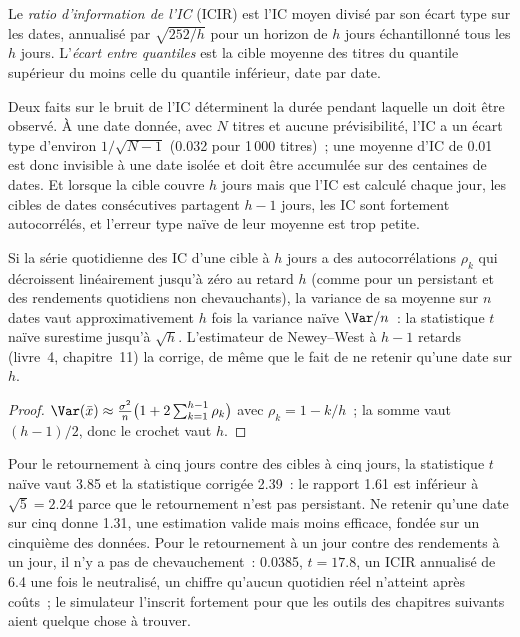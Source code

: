 \begin{definition}\label{def:rs:anatomy-of-a-predictor:icir}
Le \emph{ratio d'information de l'IC} (ICIR) est l'IC moyen divisé par son écart type sur les
dates, annualisé par $\sqrt{252/h}$ pour un horizon de $h$ jours échantillonné tous les $h$ jours. L'\emph{écart entre quantiles} est
la cible moyenne des titres du quantile supérieur du  moins celle du quantile inférieur, date par date.
\end{definition}

Deux faits sur le bruit de l'IC déterminent la durée pendant laquelle un  doit être observé. À une date donnée, avec $N$ titres
et aucune prévisibilité, l'IC a un écart type d'environ $1/\sqrt{N - 1}$ (0.032 pour 1\,000 titres)~; une moyenne d'IC de 0.01 est donc
invisible à une date isolée et doit être accumulée sur des centaines de dates. Et lorsque la cible couvre $h$ jours mais que l'IC est calculé chaque jour, les
cibles de dates consécutives partagent $h - 1$ jours, les IC sont fortement autocorrélés, et
l'erreur type naïve de leur moyenne est trop petite.

\begin{proposition}\label{prop:rs:anatomy-of-a-predictor:overlap}
Si la série quotidienne des IC d'une cible à $h$ jours a des autocorrélations $\rho_k$ qui décroissent linéairement jusqu'à zéro au retard $h$ (comme pour un
 persistant et des rendements quotidiens non chevauchants), la variance de sa moyenne sur $n$ dates vaut approximativement $h$ fois la
variance naïve $\Var/n$~: la statistique $t$ naïve surestime jusqu'à $\sqrt h$. L'estimateur de Newey--West à $h - 1$ retards (livre~4,
chapitre~11) la corrige, de même que le fait de ne retenir qu'une date sur $h$.
\end{proposition}

\begin{proof}
$\Var(\bar x) \approx \frac{\sigma^2}{n}\bigl(1 + 2\sum_{k=1}^{h-1}\rho_k\bigr)$ avec $\rho_k = 1 - k/h$~; la somme vaut $(h - 1)/2$, donc le
crochet vaut $h$.
\end{proof}

Pour le retournement à cinq jours contre des cibles à cinq jours, la statistique $t$ naïve vaut 3.85 et la statistique corrigée 2.39~: le rapport 1.61 est
inférieur à $\sqrt5 = 2.24$ parce que le retournement n'est pas persistant. Ne retenir qu'une date sur cinq donne 1.31, une estimation valide mais moins
efficace, fondée sur un cinquième des données. Pour le retournement à un jour contre des rendements à un jour, il n'y a pas de chevauchement~: 0.0385, $t = 17.8$, un
ICIR annualisé de 6.4 une fois le  neutralisé, un chiffre qu'aucun  quotidien réel n'atteint après coûts~; le simulateur
l'inscrit fortement pour que les outils des chapitres suivants aient quelque chose à trouver.

